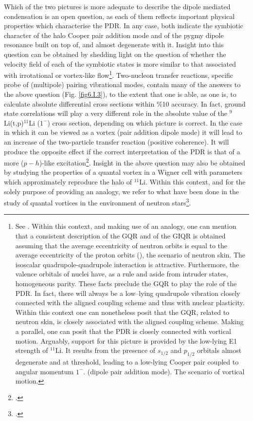 \begin{subappendices}
Which of the two  pictures is more adequate to describe  the dipole mediated condensation is an open question,  
as each of them reflects  important physical properties which   characterise  the PDR. In any case, both indicate the symbiotic character  of the halo Cooper pair  addition mode  and of the pygmy dipole resonance  built on top of, and almost degenerate with it. 
Insight into this question can be obtained  by shedding light on the question  of whether  the velocity field of each of the symbiotic  states is more similar  to that associated  with irrotational or vortex-like flow\footnote{See \cite{Repko:13}. Within this context, and making use of an analogy, one can  mention that a consistent description of the GQR and of the GIQR is obtained 
assuming that the average eccentricity of neutron orbits 
is equal to the average eccentricity of the proton orbits (\cite{Bes:75c}), the scenario of neutron skin.
The  isoscalar quadrupole-quadrupole interaction is attractive. Furthermore, 
the valence orbitals of nuclei have, as a rule and aside from intruder states, homogeneous parity. These facts  preclude 
the GQR to play the role of the PDR. In fact, there will always be a low--lying quadrupole vibration closely 
connected with the aligned coupling scheme and thus  with nuclear plasticity. Within this context one can  nonetheless  posit  that the GQR, related to neutron skin,  is closely associated with the aligned coupling scheme.
Making a parallel, one can posit  that the PDR is closely connected with vortical motion. 
Arguably,  support for this picture is provided by the   low-lying  E1 
strength of $^{11}$Li. It  results from the presence of $s_{1/2}$ and $p_{1/2}$ orbitals almost degenerate and at threshold, 
leading to a low-lying Cooper pair coupled to angular momentum $1^-$. (dipole pair addition mode). 
The  scenario of vortical motion. }. Two-nucleon transfer reactions, specific probe  of (multipole) pairing vibrational modes, contain many of the answers to the above question (Fig. \ref{fig6.I.3}), to the extent that one is able, as one is, to calculate absolute differential cross sections within \%10 accuracy.
In fact,  ground state correlations will play a very different role in the absolute value of the $^9$Li(t,p)$^{11}$Li ($1^-$) cross section,
depending  on which picture is correct. In the case in which 
it can be 
 viewed as a vortex (pair addition dipole mode) it will lead to an increase of the two-particle transfer reaction 
 (positive coherence).
 It will  produce the opposite effect if the correct interpretation of the PDR   is that of a 
more ($p-h$)-like excitation\footnote{ \cite{Broglia:71}.}. 
Insight  in the above question may also be obtained by studying  the properties of
a quantal vortex in a Wigner cell with parameters which approximately reproduce 
the halo of $^{11}$Li. Within this context, and  for the solely purpose of providing an analogy, we refer 
to what have been  done in the study of quantal vortices in the environment of neutron stars\footnote{\cite{Avogadro:07,Avogadro:08}.}.



\end{subappendices}
